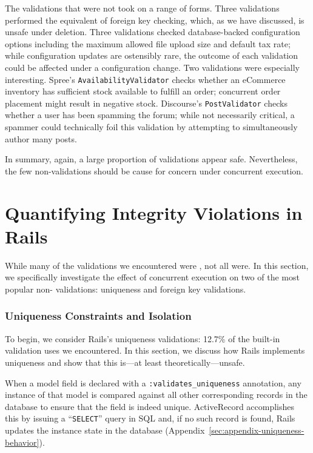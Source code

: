 The validations that were not \iconfluent took on a range of
forms. Three validations performed the equivalent of foreign key
checking, which, as we have discussed, is unsafe under deletion. Three
validations checked database-backed configuration options including
the maximum allowed file upload size and default tax rate; while
configuration updates are ostensibly rare, the outcome of each
validation could be affected under a configuration change. Two
validations were especially interesting. Spree's
\texttt{AvailabilityValidator} checks whether an eCommerce inventory
has sufficient stock available to fulfill an order; concurrent order
placement might result in negative stock. Discourse's
\texttt{PostValidator} checks whether a user has been spamming the
forum; while not necessarily critical, a spammer could technically
foil this validation by attempting to simultaneously author many posts.

In summary, again, a large proportion of validations appear
safe. Nevertheless, the few non-\iconfluent validations should be
cause for concern under concurrent execution.



\section{Quantifying Integrity Violations in Rails}
\label{sec:feral-evaluation}

While many of the validations we encountered were \iconfluent,
not all were. In this section, we specifically investigate the effect
of concurrent execution on two of the most popular non-\iconfluent
validations: uniqueness and foreign key validations.

\subsubsection{Uniqueness Constraints and Isolation}

To begin, we consider Rails's uniqueness validations: 12.7\% of the
built-in validation uses we encountered. In this section, we discuss
how Rails implements uniqueness and show that this is---at least
theoretically---unsafe.

When a model field is declared with a \texttt{:validates\_uniqueness}
annotation, any instance of that model is compared against all other
corresponding records in the database to ensure that the field is
indeed unique. ActiveRecord accomplishes this by issuing a
``\texttt{SELECT}'' query in SQL and, if no such record is found,
Rails updates the instance state in the database
(Appendix~\ref{sec:appendix-uniqueness-behavior}).

